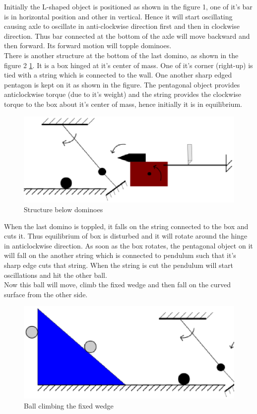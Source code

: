 \documentclass[a4paper,11pt]{article}
\begin{document}
{\indent Initially the L-shaped object is positioned as shown in the figure 1, one of it's bar is in horizontal position and other in vertical. Hence it will start oscillating causing axle to oscillate in anti-clockwise direction first and then in clockwise direction. Thus bar connected at the bottom of the axle will move backward and then forward. Its forward motion will topple dominoes. \\

\indent There is another structure at the bottom of the last domino, as shown in the figure 2 \ref{fig:image1}.  It is a box hinged at it's center of mass. One of it's corner (right-up) is tied with a string which is connected to the wall. One another sharp edged pentagon is kept on it as shown in the figure. The pentagonal object provides anticlockwise torque (due to it's weight) and the string provides the clockwise torque to the box about it's center of mass, hence initially it is in equilibrium. 
\begin{figure}[h]
    \centering
    \label{fig:image1}
    \includegraphics[scale=0.6]{images/image1}
    \caption{Structure below dominoes}
\end{figure}

\indent When the last domino is toppled, it falls on the string connected to the box and cuts it. Thus equilibrium of box is disturbed and it will rotate around the hinge in anticlockwise direction. As soon as the box rotates, the pentagonal object on it will fall on the another string which is connected to pendulum such that it's sharp edge cuts that string. When the string is cut the pendulum will start oscillations and hit the other ball. \\

\newpage
\indent Now this ball will move, climb the fixed wedge and then fall on the curved surface from the other side.
\begin{figure}[h]
    \centering
    \label{fig:image2}
    \includegraphics[scale=0.4]{images/image2}
    \caption{Ball climbing the fixed wedge}
\end{figure}


}
\end{document}
